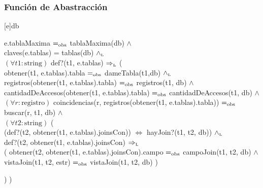 \pagebreak

\subsubsection{Funci\'on de Abastracci\'on}


[e]{db}{
	e.tablaMaxima $=_{\mathrm{obs}}$ tablaMaxima(db) $\land$ \\

	claves(e.tablas) = tablas(db) $\land_{\mathrm{\scriptscriptstyle{L}}}$ \\

	$(\forall t1:\text{string})$ def?(t1, e.tablas) $\Rightarrow_{\mathrm{\scriptscriptstyle{L}}}$ ( \\

	  \hspace*{3mm} obtener(t1, e.tablas).tabla $=_{\mathrm{obs}}$ dameTabla(t1,db) $\land_{\mathrm{\scriptscriptstyle{L}}}$ \\

	  \hspace*{3mm} registros(obtener(t1, e.tablas).tabla) $=_{\mathrm{obs}}$ registros(t1, db) $\land$ \\

	  \hspace*{3mm} cantidadDeAccesos(obtener(t1, e.tablas).tabla) $=_{\mathrm{obs}}$ cantidadDeAccesos(t1, db) $\land$ \\
	  
	  \hspace*{3mm} $(\forall r:\text{registro})$ 
	  coincidencias(r, registros(obtener(t1, e.tablas).tabla)) $=_{\mathrm{obs}}$ buscar(r, t1, db) $\land$ \\
	  

 	 \hspace*{3mm} $(\forall t2:\text{string})$ ( \\
	  
	 \hspace*{6mm}  (def?(t2, obtener(t1, e.tablas).joinsCon)) $\iff$ hayJoin?(t1, t2, db)) $\land_{\mathrm{\scriptscriptstyle{L}}}$ \\
	   
	 \hspace*{6mm}  def?(t2, obtener(t1, e.tablas).joinsCon) $\Rightarrow_{\mathrm{\scriptscriptstyle{L}}}$ \\
	   
	  \hspace*{9mm}   (  obtener(t2, obtener(t1, e.tablas).joinsCon).campo $=_{\mathrm{obs}}$ campoJoin(t1, t2, db) $\land$   \\
	     
	 \hspace*{9mm}    vistaJoin(t1, t2, estr) $=_{\mathrm{obs}}$ vistaJoin(t1, t2, db)
	    )
	    
	   ) 
	 )
	  
}

